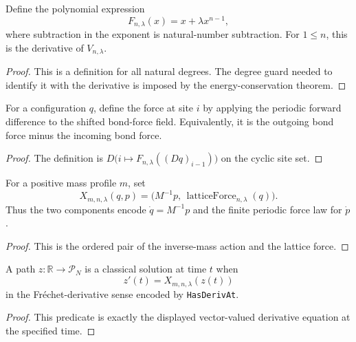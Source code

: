 \begin{definition}
\label{def:microscopic:interaction-force}
Define the polynomial expression
\[
  F_{n,\lambda}(x)=x+\lambda x^{n-1},
\]
where subtraction in the exponent is natural-number subtraction.  For
$1\le n$, this is the derivative of $V_{n,\lambda}$.
\end{definition}
\begin{proof}

\leanok
This is a definition for all natural degrees.  The degree guard needed to
identify it with the derivative is imposed by the energy-conservation theorem.
\end{proof}

\begin{definition}
\label{def:microscopic:lattice-force}
For a configuration $q$, define the force at site $i$ by applying the periodic
forward difference to the shifted bond-force field.  Equivalently, it is the
outgoing bond force minus the incoming bond force.
\end{definition}
\begin{proof}

\leanok
The definition is
$D\bigl(i\mapsto F_{n,\lambda}((Dq)_{i-1})\bigr)$ on the cyclic site set.
\end{proof}

\begin{definition}
\label{def:microscopic:vector-field}
For a positive mass profile $m$, set
\[
  X_{m,n,\lambda}(q,p)
   =\bigl(M^{-1}p,\,\operatorname{latticeForce}_{n,\lambda}(q)\bigr).
\]
Thus the two components encode $\dot q=M^{-1}p$ and the finite periodic force
law for $\dot p$.
\end{definition}
\begin{proof}

\leanok
This is the ordered pair of the inverse-mass action and the lattice force.
\end{proof}

\begin{definition}
\label{def:microscopic:classical-solution-at}
A path $z:\mathbb R\to\mathcal P_N$ is a classical solution at time $t$ when
\[
  z'(t)=X_{m,n,\lambda}(z(t))
\]
in the Fr\'echet-derivative sense encoded by \texttt{HasDerivAt}.
\end{definition}
\begin{proof}

\leanok
This predicate is exactly the displayed vector-valued derivative equation at
the specified time.
\end{proof}

